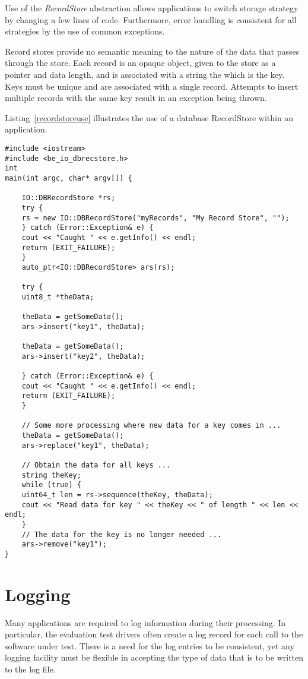 Use of the {\em RecordStore} abstraction allows applications to switch
storage strategy by changing a few lines of code. Furthermore, error handling
is consistent for all strategies by the use of common exceptions.

Record stores provide no semantic meaning to the nature of the data that passes
through the store. Each record is an opaque object, given to the store as a
pointer and data length, and is associated with a string the which is the key.
Keys must
be unique and are associated with a single record. Attempts to insert multiple
records with the same key result in an exception being thrown.

Listing~\ref{recordstoreuse} illustrates the use of a database RecordStore
within an application.

\lstset{language=c++}
\begin{lstlisting}[caption={Using a RecordStore}, label=recordstoreuse]
#include <iostream>
#include <be_io_dbrecstore.h>
int
main(int argc, char* argv[]) {

    IO::DBRecordStore *rs;
    try {
	rs = new IO::DBRecordStore("myRecords", "My Record Store", "");
    } catch (Error::Exception& e) {
	cout << "Caught " << e.getInfo() << endl;
	return (EXIT_FAILURE);
    }
    auto_ptr<IO::DBRecordStore> ars(rs);

    try {
	uint8_t *theData;

	theData = getSomeData();
	ars->insert("key1", theData);

	theData = getSomeData();
	ars->insert("key2", theData);

    } catch (Error::Exception& e) {
	cout << "Caught " << e.getInfo() << endl;
	return (EXIT_FAILURE);
    }

    // Some more processing where new data for a key comes in ...
    theData = getSomeData();
    ars->replace("key1", theData);
  
    // Obtain the data for all keys ...
    string theKey;
    while (true) {
	uint64_t len = rs->sequence(theKey, theData);
	cout << "Read data for key " << theKey << " of length " << len << endl;
    }
    // The data for the key is no longer needed ...
    ars->remove("key1");
}
\end{lstlisting}

\section{Logging}
\label{sec-logging}

Many applications are required to log information during their processing. In
particular, the evaluation test drivers often create a log record for each
call to the software under test. There is a need for the log entries to be
consistent, yet any logging facility must be flexible in accepting the type of
data that is to be written to the log file.

